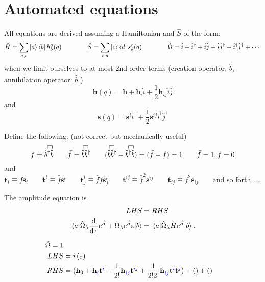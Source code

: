 \documentclass{article}
\newcommand{\bh}{\textbf{h}}
\newcommand{\bs}{\textbf{s}}
\newcommand{\bt}{\textbf{t}}
\newcommand{\up}[1]{\hat{#1}^{\dagger}}
\newcommand{\down}[1]{\hat{#1}}
\begin{document}
%
%
%
%
\section{Automated equations}
All equations are derived assuming a Hamiltonian and $\hat{S}$ of the form:
\begin{equation}
    \hat{H} = \sum_{a,b} \ket{a}\bra{b}h^{a}_{b}(q)
\qquad\qquad
    \hat{S} = \sum_{c,d} \ket{c}\bra{d}s^{c}_{d}(q)
\qquad\qquad
    \hat{\Omega} = \down{i} + \up{i} + \down{i}\down{j} + \down{i}\up{j} + \up{i}\up{j} + \cdots
\end{equation}
when we limit ourselves to at most 2nd order terms (creation operator: $\down{b}$, annihilation operator: $\up{b}$)
\begin{equation}
    \bh(q) = \bh + \bh_{i}\down{i} + \frac{1}{2}\bh_{ij}\down{i}\down{j}
\end{equation}
and
\begin{equation}
    \bs(q) = \bs^{i}\up{i} + \frac{1}{2}\bs^{ij}\up{i}\up{j}
\end{equation}

Define the following: (not correct but mechanically useful)
\begin{equation}
    f = \contraction[1ex]{}{\up{b}}{}{\down{b}}\up{b}\down{b}
\qquad
    \bar{f} = \contraction[1ex]{}{\down{b}}{}{\up{b}}\down{b}\up{b}
\qquad
    (
    \contraction[1ex]{}{\down{b}}{}{\up{b}}\down{b}\up{b}
    -
    \contraction[1ex]{}{\up{b}}{}{\down{b}}\up{b}\down{b}
    )
    = (\bar{f} - f) = 1
\qquad
    \bar{f} = 1, f = 0
\end{equation}
and
\begin{equation}
    \bt_{i} \equiv f\bs_{i}
\qquad
    \bt^{i} \equiv \bar{f}\bs^{i}
\qquad
    \bt^{i}_{j} \equiv \bar{f}f\bs^{i}_{j}
\qquad
    \bt^{ij} \equiv \bar{f}^2\bs^{ij}
\qquad
    \bt_{ij} \equiv f^2\bs_{ij}
\qquad
    \text{and so forth ....}
\end{equation}

The amplitude equation is
\begin{align}
    LHS &= RHS
\\
    \mel{a}{\hat{\Omega}_{\lambda}\dv{\tau}e^{\hat{S}} + \hat{\Omega}_{\lambda}e^{\hat{S}}\varepsilon}{b}
    &= \mel{a}{\hat{\Omega}_{\lambda}\hat{H}e^{\hat{S}}}{b}.
\end{align}
\clearpage

%
%
%
%
%
%


%
%
%
%
%

\begin{align}\begin{split}
    \hat{\Omega} = 1
\\ LHS &=
    i\left(\varepsilon\right)
\\ RHS &=
%
%
(\bh_0 + \bh^{\blue{}\red{}}_{\blue{i}\red{}}\bt^{\blue{i}\red{}} + \frac{1}{2!}\bh^{\blue{}\red{}}_{\blue{ij}\red{}}\bt^{\blue{ij}\red{}} + \frac{1}{2!2!}\bh^{\blue{}\red{}}_{\blue{ij}\red{}}\bt^{\blue{i}\red{}}\bt^{\blue{j}\red{}}) + () + ()
\end{split}\end{align}
\end{document}

